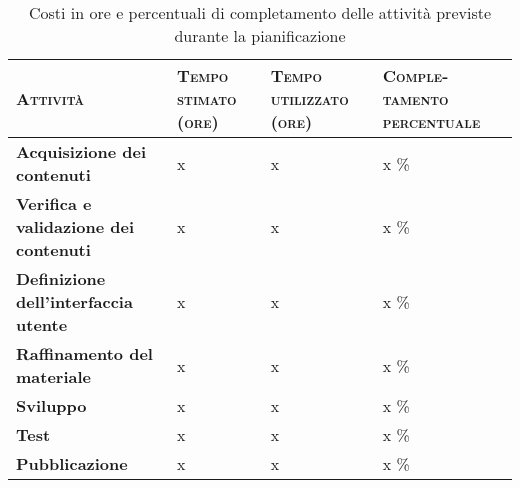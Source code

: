 \begin{longtabu} to \textwidth {|X[4,L,m]|X[1,C,m]|X[1,C,m]|X[1,C,m]|}
	\caption{Costi in ore e percentuali di completamento delle attività previste durante la pianificazione}
	\label{tab:docPianificazione}\\
	\hline
	{\color[HTML]{FFFFFF} \textbf{\footnotesize \textsc{Attività}}} & {\color[HTML]{FFFFFF} \textbf{\footnotesize \textsc{Tempo stimato (ore)}}} & {\color[HTML]{FFFFFF} \textbf{\footnotesize \textsc{Tempo utilizzato (ore)}}} & {\color[HTML]{FFFFFF} \textbf{\footnotesize \textsc{Comple-\allowbreak{}tamento percentuale}}} \\ \hline
	\endhead
	\textbf{Acquisizione dei contenuti}               & x                                                            & x                                                               & x \%                                                                  \\ \hline
	\textbf{Verifica e validazione dei contenuti}     & x                                                            & x                                                               & x \%                                                                  \\ \hline
	\textbf{Definizione dell'interfaccia utente}      & x                                                            & x                                                               & x \%                                                                  \\ \hline
	\textbf{Raffinamento del materiale}               & x                                                            & x                                                               & x \%                                                                  \\ \hline
	\textbf{Sviluppo}                                 & x                                                            & x                                                               & x \%                                                                  \\ \hline
	\textbf{Test}                                     & x                                                            & x                                                               & x \%                                                                  \\ \hline
	\textbf{Pubblicazione}                            & x                                                            & x                                                               & x \%                                                                  \\ \hline
\end{longtabu}

